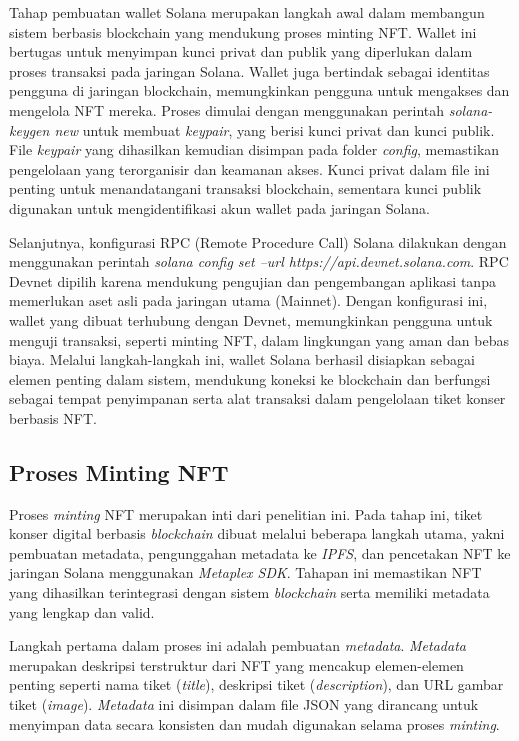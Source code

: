 Tahap pembuatan wallet Solana merupakan langkah awal dalam membangun sistem berbasis blockchain yang mendukung proses minting NFT. Wallet ini bertugas untuk menyimpan kunci privat dan publik yang diperlukan dalam proses transaksi pada jaringan Solana. Wallet juga bertindak sebagai identitas pengguna di jaringan blockchain, memungkinkan pengguna untuk mengakses dan mengelola NFT mereka. Proses dimulai dengan menggunakan perintah \textit{solana-keygen new} untuk membuat \textit{keypair}, yang berisi kunci privat dan kunci publik. File \textit{keypair} yang dihasilkan kemudian disimpan pada folder \textit{config}, memastikan pengelolaan yang terorganisir dan keamanan akses. Kunci privat dalam file ini penting untuk menandatangani transaksi blockchain, sementara kunci publik digunakan untuk mengidentifikasi akun wallet pada jaringan Solana.

Selanjutnya, konfigurasi RPC (Remote Procedure Call) Solana dilakukan dengan menggunakan perintah \textit{solana config set --url https://api.devnet.solana.com}. RPC Devnet dipilih karena mendukung pengujian dan pengembangan aplikasi tanpa memerlukan aset asli pada jaringan utama (Mainnet). Dengan konfigurasi ini, wallet yang dibuat terhubung dengan Devnet, memungkinkan pengguna untuk menguji transaksi, seperti minting NFT, dalam lingkungan yang aman dan bebas biaya. Melalui langkah-langkah ini, wallet Solana berhasil disiapkan sebagai elemen penting dalam sistem, mendukung koneksi ke blockchain dan berfungsi sebagai tempat penyimpanan serta alat transaksi dalam pengelolaan tiket konser berbasis NFT.

\subsection{Proses Minting NFT}

Proses \textit{minting} NFT merupakan inti dari penelitian ini. Pada tahap ini, tiket konser digital berbasis \textit{blockchain} dibuat melalui beberapa langkah utama, yakni pembuatan metadata, pengunggahan metadata ke \textit{IPFS}, dan pencetakan NFT ke jaringan Solana menggunakan \textit{Metaplex SDK}. Tahapan ini memastikan NFT yang dihasilkan terintegrasi dengan sistem \textit{blockchain} serta memiliki metadata yang lengkap dan valid.

Langkah pertama dalam proses ini adalah pembuatan \textit{metadata}. \textit{Metadata} merupakan deskripsi terstruktur dari NFT yang mencakup elemen-elemen penting seperti nama tiket (\textit{title}), deskripsi tiket (\textit{description}), dan URL gambar tiket (\textit{image}). \textit{Metadata} ini disimpan dalam file JSON yang dirancang untuk menyimpan data secara konsisten dan mudah digunakan selama proses \textit{minting}.

